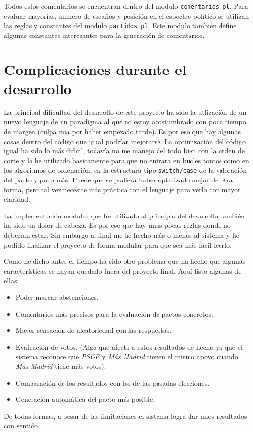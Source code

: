 \documentclass[a4paper, 12pt]{article}
\begin{document}
	Todos estos comentarios se encuentran dentro del modulo 
\texttt{comentarios.pl}. Para evaluar mayorías, numero de escaños y posición en 
el espectro político se utilizan las reglas y constantes del modulo 
\texttt{partidos.pl}. Este modulo también define algunas constantes interesantes
para la generación de comentarios.

\section{Complicaciones durante el desarrollo}

	La principal dificultad del desarrollo de este proyecto ha sido la 
utlización de un nuevo lenguaje de un paradigma al que no estoy acostumbrado con
poco tiempo de margen (culpa mia por haber empezado tarde). Es por eso que hay 
algunas cosas dentro del código que igual podrían mejorarse. La optimización del 
código igual ha sido lo más dificil, todavía no me manejo del todo bien con la 
orden de corte y la he utilizado basicamente para que no entrara en bucles 
tontos como en los algoritmos de ordenación, en la estructura tipo 
\texttt{switch/case} de la valoración del pacto y poco más. Puede que se pudiera 
haber optmizado mejor de otra forma, pero tal vez necesite más práctica con el
lenguaje para verlo con mayor claridad.\\\mbox{}

	La implementación modular que he utilizado al principio del desarrollo 
también ha sido un dolor de cabeza. Es por eso que hay unas pocas reglas donde
no deberían estar. Sin embargo al final me he hecho más o menos al sistema y he 
podido finalizar el proyecto de forma modular para que sea más fácil leerlo.
\\\mbox{}

	Como he dicho antes el tiempo ha sido otro problema que ha hecho que algunas
características se hayan quedado fuera del proyecto final. Aquí listo algunas de
ellas:
\begin{itemize}
	\item Poder marcar abstenciones.
	\item Comentarios más precisos para la evaluación de pactos concretos.
	\item Mayor sensación de aleatoriedad con las respuestas.
	\item Evaluación de votos. (Algo que afecta a estos resultados de hecho ya
		  que el sistema reconoce que \textit{PSOE} y \textit{Más Madrid} tienen
		  el mismo apoyo cuando \textit{Más Madrid} tiene más votos).
	\item Comparación de los resultados con los de las pasadas elecciones.
	\item Generación automática del pacto más posible.
\end{itemize}
De todas formas, a pesar de las limitaciones el sistema logra dar unos
resultados con sentido.\\\mbox{}
\end{document}
